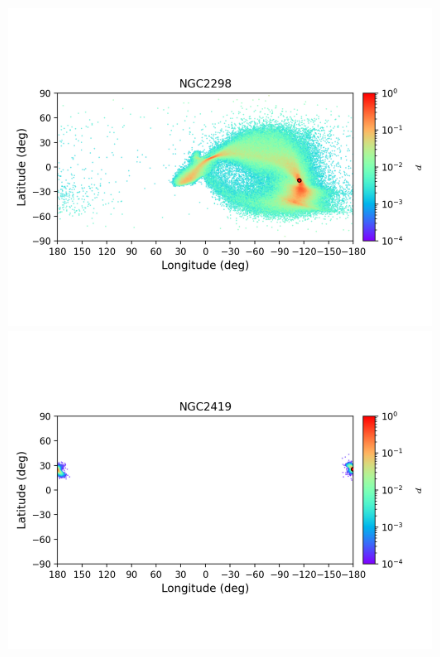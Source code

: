 \begin{figure}
\begin{center}
                \includegraphics[clip=true, trim = 0mm 20mm 0mm 10mm, width=1\columnwidth]{images/error_plots_NGC2298.png}
                \includegraphics[clip=true, trim = 0mm 20mm 0mm 10mm, width=1\columnwidth]{images/error_plots_NGC2419.png}
                

\end{center}
\end{figure}
